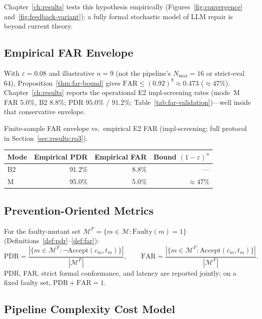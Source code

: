 \noindent
Chapter~\ref{ch:results} tests this hypothesis empirically
(Figures~\ref{fig:convergence} and~\ref{fig:feedback-variant}); a fully formal
stochastic model of LLM repair is beyond current theory.

\subsection{Empirical FAR Envelope}
\label{subsec:far-validation}

With $\varepsilon = 0.08$ and illustrative $n = 9$ (not the pipeline's
$N_{\max}{=}16$ or strict-eval 64), Proposition~\ref{thm:far-bound} gives
$\mathrm{FAR} \leq (0.92)^9 \approx 0.473$ ($\approx 47\%$).
Chapter~\ref{ch:results} reports the operational E2 impl-screening rates
(mode~M FAR $5.0\%$, B2 $8.8\%$; PDR $95.0\%$ / $91.2\%$;
Table~\ref{tab:far-validation})---well inside that conservative envelope.

\begin{inlinetable}{Finite-sample FAR envelope vs.\ empirical E2 FAR
  (impl-screening; full protocol in Section~\ref{sec:results:rq3}).}
  \label{tab:far-validation}
  \footnotesize
  \begin{tabular}{lrrr}
    \toprule
    Mode & Empirical PDR & Empirical FAR & Bound $(1-\varepsilon)^n$ \\
    \midrule
    B2  & 91.2\% & 8.8\% & --- \\
    M   & 95.0\% & 5.0\% & $\approx 47\%$ \\
    \bottomrule
  \end{tabular}
\end{inlinetable}

\subsection{Prevention-Oriented Metrics}
\label{subsec:metrics}

For the faulty-mutant set $\mathcal{M}^F=\{m\in\mathcal{M}:\mathrm{Faulty}(m)=1\}$
(Definitions~\ref{def:pdr}--\ref{def:far}):
\begin{equation}
  \mathrm{PDR} = \frac{|\{m \in \mathcal{M}^F : \neg\mathrm{Accept}(c_m, t_m)\}|}{|\mathcal{M}^F|},
  \qquad
  \mathrm{FAR} = \frac{|\{m \in \mathcal{M}^F : \mathrm{Accept}(c_m, t_m)\}|}{|\mathcal{M}^F|}.
\end{equation}
PDR, FAR, strict formal conformance, and latency are reported jointly;
on a fixed faulty set, $\mathrm{PDR}+\mathrm{FAR}=1$.

\subsection{Pipeline Complexity Cost Model}
\label{subsec:complexity-cost}

